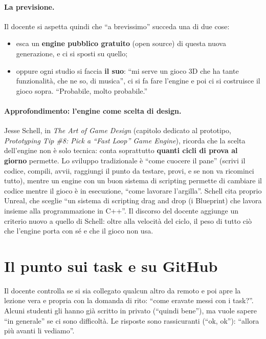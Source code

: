 \paragraph{La previsione.} Il docente si aspetta quindi che ``a brevissimo''
succeda una di due cose:
\begin{itemize}
  \item esca un \textbf{engine pubblico gratuito} (open source) di questa nuova
        generazione, e ci si sposti su quello;
  \item oppure ogni studio si faccia \textbf{il suo}: ``mi serve un gioco 3D
        che ha tante funzionalità, che ne so, di musica'', ci si fa fare
        l'engine e poi ci si costruisce il gioco sopra. ``Probabile, molto
        probabile.''
\end{itemize}

\paragraph{Approfondimento: l'engine come scelta di design.} Jesse Schell, in
\emph{The Art of Game Design} (capitolo dedicato al prototipo, \emph{Prototyping
Tip \#8: Pick a ``Fast Loop'' Game Engine}), ricorda che la scelta dell'engine
non è solo tecnica: conta soprattutto \textbf{quanti cicli di prova al giorno}
permette. Lo sviluppo tradizionale è ``come cuocere il pane'' (scrivi il codice,
compili, avvii, raggiungi il punto da testare, provi, e se non va ricominci
tutto), mentre un engine con un buon sistema di scripting permette di
cambiare il codice mentre il gioco è in esecuzione, ``come lavorare
l'argilla''. Schell cita proprio Unreal, che sceglie ``un sistema di scripting
drag and drop (i Blueprint) che lavora insieme alla programmazione in C++''. Il
discorso del docente aggiunge un criterio nuovo a quello di Schell: oltre alla
velocità del ciclo, il peso di tutto ciò che l'engine porta con sé e che il
gioco non usa.

\section{Il punto sui task e su GitHub}
\label{gd16:sec:task-github}

Il docente controlla se si sia collegato qualcun altro da remoto e poi
apre la lezione vera e propria con la domanda di rito: ``come eravate messi
con i task?''. Alcuni studenti gli hanno già scritto in privato (``quindi
bene''), ma vuole sapere ``in generale'' se ci sono difficoltà. Le risposte
sono rassicuranti (``ok, ok''): ``allora più avanti li vediamo''.

